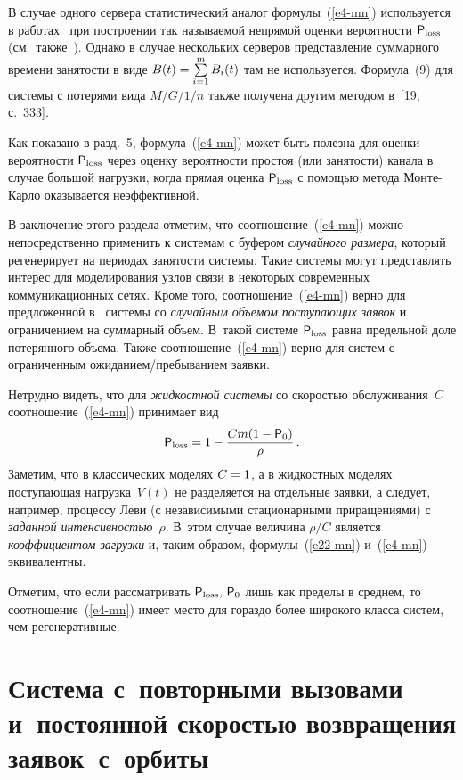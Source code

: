 \begin{multicols}{2}
\smallskip

В случае одного сервера  статистический аналог
формулы~(\ref{e4-mn}) используется   в работах~\cite{Whitt91, Whitt90} при
построении так называемой непрямой оценки вероятности ${\sf P}_{\mathrm{loss}}$ (см.\ также~\cite{GM}). 
Однако в случае нескольких серверов представление
 суммарного времени занятости в виде $B(t)\hm=\sum\limits_{i=1}^mB_i(t)$ там не используется.
 Формула~(9) для системы с потерями вида $M/G/1/n$ так\-же получена другим методом 
 в~[19, с.~333].

 Как показано  в разд.~5,  формула~(\ref{e4-mn})  может быть полезна для  оценки
 вероятности ${\sf P}_{\mathrm{loss}}$ через оценку вероятности простоя (или занятости)
 канала в случае большой нагрузки, когда прямая оценка ${\sf P}_{\mathrm{loss}}$ с помощью метода Мон\-те-Кар\-ло
оказывается неэффективной.

В заключение этого раздела отметим, что  соотношение~(\ref{e4-mn}) можно
непосредственно применить к системам с буфером {\it случайного размера},
который  регенерирует на периодах занятости сис\-те\-мы. Такие сис\-те\-мы могут
представлять интерес для моделирования  узлов связи в некоторых современных
коммуникационных сетях. Кроме того, соотношение~(\ref{e4-mn}) верно  для предложенной 
в~\cite{Tih} системы со {\it случайным объемом поступающих заявок} и ограничением
на  суммарный объем. В~такой  системе  ${\sf P}_{\mathrm{loss}}$   равна предельной доле
потерянного объема. Также соотношение~(\ref{e4-mn}) верно для систем с ограниченным
ожиданием/пребыванием заявки.

Нетрудно видеть, что  для {\it жидкостной системы} со скоростью обслуживания~$C$  
соотношение~(\ref{e4-mn}) принимает вид 
\begin{equation} 
{\sf P}_{\mathrm{loss}}=1-\displaystyle\frac{\displaystyle Cm (1-{\sf P}_0)\mathstrut}{\displaystyle \rho\mathstrut}\,.
\label{e22-mn} 
\end{equation} 
Заметим, что в классических моделях $C\hm=1$, а  в жидкостных моделях поступающая 
нагрузка~$V(t)$ не разделяется на отдельные заявки, а следует, например,  
процессу Леви (с независимыми стационарными приращениями) с {\it заданной интенсивностью}~$\rho$. 
В~этом случае величина $\rho/C$  является {\it коэффициентом загрузки} и, таким
образом, формулы~(\ref{e22-mn}) и~(\ref{e4-mn}) эквивалентны. 

Отметим, что если рассматривать ${\sf P}_{\mathrm{loss}},\,{\sf P}_0$ лишь как пределы в среднем,
то соотношение~(\ref{e4-mn}) имеет место   для гораздо более широкого класса
сис\-тем, чем регенеративные.

\section{Система с~повторными вызовами и~постоянной скоростью возвращения
заявок~с~орбиты}


\end{multicols}
